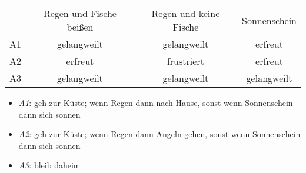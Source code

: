 \begin{tabular}{c|c|c|c|}
\multicolumn{1}{c}{}  & \multicolumn{1}{c}{Regen und Fische beißen}  & \multicolumn{1}{c}{Regen und keine Fische}  & \multicolumn{1}{c}{Sonnenschein} \\ \cline{2-4}
 A1 & gelangweilt & gelangweilt & erfreut \\ \cline{2-4}
 A2 & erfreut & frustriert & erfreut \\ \cline{2-4}
 A3 & gelangweilt & gelangweilt & gelangweilt \\ \cline{2-4}
\end{tabular}
\begin{itemize}
\item {\em A1}: geh zur Küste;  wenn Regen dann nach Hause,  sonst wenn Sonnenschein dann sich sonnen
\item {\em A2}: geh zur Küste;  wenn Regen dann Angeln gehen,  sonst wenn Sonnenschein dann sich sonnen
\item {\em A3}: bleib daheim
\end{itemize}
